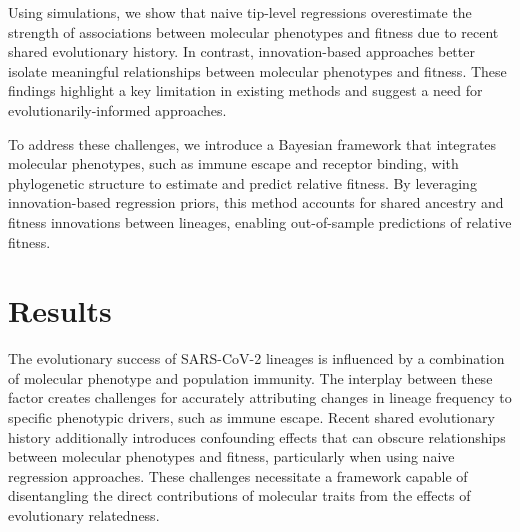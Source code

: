 Using simulations, we show that naive tip-level regressions overestimate the strength of associations between molecular phenotypes and fitness due to recent shared evolutionary history.
In contrast, innovation-based approaches better isolate meaningful relationships between molecular phenotypes and fitness.
These findings highlight a key limitation in existing methods and suggest a need for evolutionarily-informed approaches.

To address these challenges, we introduce a Bayesian framework that integrates molecular phenotypes, such as immune escape and receptor binding, with phylogenetic structure to estimate and predict relative fitness.
By leveraging innovation-based regression priors, this method accounts for shared ancestry and fitness innovations between lineages, enabling out-of-sample predictions of relative fitness.

%
%
%
%

\section{Results}

The evolutionary success of SARS-CoV-2 lineages is influenced by a combination of molecular phenotype and population immunity.
The interplay between these factor creates challenges for accurately attributing changes in lineage frequency to specific phenotypic drivers, such as immune escape.
Recent shared evolutionary history additionally introduces confounding effects that can obscure relationships between molecular phenotypes and fitness, particularly when using naive regression approaches.
These challenges necessitate a framework capable of disentangling the direct contributions of molecular traits from the effects of evolutionary relatedness.

